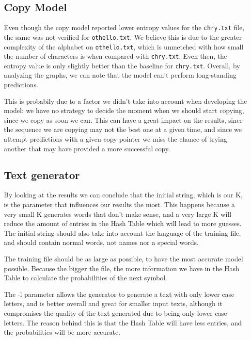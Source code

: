 \documentclass{article}
\begin{document}
\subsection{Copy Model}

Even though the copy model reported lower entropy values for the \verb|chry.txt| file, the same was not verified for \verb|othello.txt|.
We believe this is due to the greater complexity of the alphabet on \verb|othello.txt|, which is unmetched with how small the number of characters is when compared with \verb|chry.txt|.
Even then, the entropy value is only slightly better than the baseline for \verb|chry.txt|.
Overall, by analyzing the graphs, we can note that the model can't perform long-standing predictions.

This is probabily due to a factor we didn't take into account when developing the model: we have no strategy to decide the moment when we should start copying, since we copy as soon we can.
This can have a great impact on the results, since the sequence we are copying may not the best one at a given time, and since we attempt predictions with a given copy pointer we miss the chance of trying another that may have provided a more successful copy.

\subsection{Text generator}

By looking at the results we can conclude that the initial string, which is our K, is the parameter that influences our results the most.
This happens because a very small K generates words that don't make sense, and a very large K will reduce the amount of entries 
in the Hash Table which will lead to more guesses. The initial string should also take into account the language of the training file,
and should contain normal words, not names nor a special words. 

The training file should be as large as possible, to have the most accurate model possible. Because the bigger the file, the more 
information we have in the Hash Table to calculate the probabilities of the next symbol.

The -l parameter allows the generator to generate a text with only lower case letters, and is better overall and great for smaller input texts,
although it compromises the quality of the text generated due to being only lower case letters. 
The reason behind this is that the Hash Table will have less entries, and the probabilities will be more accurate.
\end{document}
